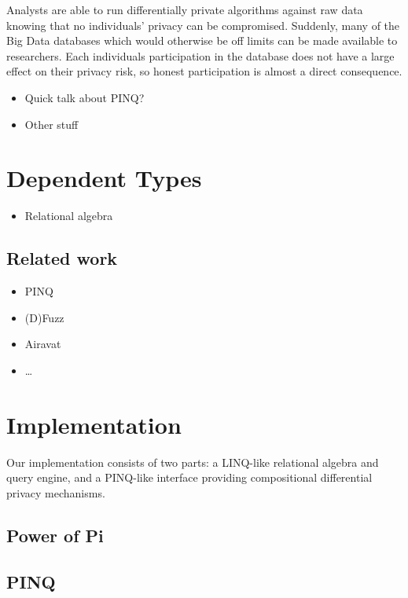 \documentclass[12pt]{article}
\begin{document}
Analysts are able to run differentially private algorithms against raw data knowing that no individuals' privacy can be compromised.
Suddenly, many of the Big Data databases which would otherwise be off limits can be made available to researchers.
Each individuals participation in the database does not have a large effect on their privacy risk, so honest participation is almost a direct consequence.

\begin{itemize}
  \item Quick talk about PINQ?
  \item Other stuff
\end{itemize}

\section{Dependent Types}

\begin{itemize}
  \item Relational algebra
\end{itemize}

\subsection{Related work}\label{sec:related_work}

\begin{itemize}
  \item PINQ
  \item (D)Fuzz
  \item Airavat
  \item \ldots
\end{itemize}

\section{Implementation}\label{sec:implementation}

Our implementation consists of two parts: a LINQ-like relational algebra and query engine, and a PINQ-like interface providing compositional differential privacy mechanisms.

\subsection{Power of Pi}\label{sec:power_of_pi}



\subsection{PINQ}\label{sec:pinq}
\end{document}
